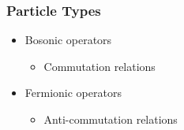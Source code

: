     \begin{frame}[t]
        \frametitle{Particle Types}
        
        \vspace{-0.4cm}

        \begin{minipage}[t]{0.5\textwidth}
            \vspace{0pt}
            \begin{itemize}
                \item Bosonic operators
                \begin{itemize}
                    \item Commutation relations
                \end{itemize}
                \item Fermionic operators \pause
                \begin{itemize}
                    \item Anti-commutation relations
                \end{itemize}
            \end{itemize}
        \end{minipage}%
        \onslide
        \hfill
        \begin{minipage}[t]{0.45\textwidth}
            \vspace{0pt}
        \end{minipage}

        \onslide %
    \end{frame}

